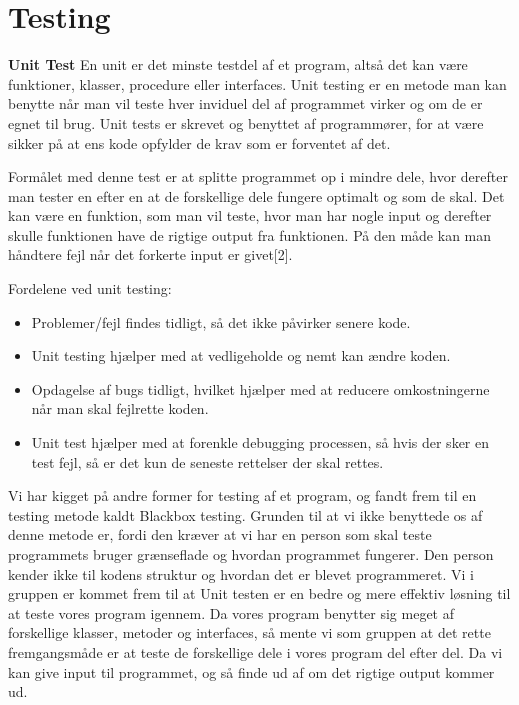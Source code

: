 \section{Testing}\label{Testing}

\textbf{Unit Test} \newline
En unit er det minste testdel af et program, altså det kan være funktioner, klasser, procedure eller interfaces. Unit testing er en metode man kan benytte når man vil teste hver inviduel del af programmet virker og om de er egnet til brug. Unit tests er skrevet og benyttet af programmører, for at være sikker på at ens kode opfylder de krav som er forventet af det. 

\vspace {5mm}

Formålet med denne test er at splitte programmet op i mindre dele, hvor derefter man tester en efter en at de forskellige dele fungere optimalt og som de skal. Det kan være en funktion, som man vil teste, hvor man har nogle input og derefter skulle funktionen have de rigtige output fra funktionen. På den måde kan man håndtere fejl når det forkerte input er givet[2].

\vspace {5mm}

Fordelene ved unit testing:
\begin{itemize}
\item Problemer/fejl findes tidligt, så det ikke påvirker senere kode.
\item Unit testing hjælper med at vedligeholde og nemt kan ændre koden.
\item Opdagelse af bugs tidligt, hvilket hjælper med at reducere omkostningerne når man skal fejlrette koden.
\item Unit test hjælper med at forenkle debugging processen, så hvis der sker en test fejl, så er det kun de seneste rettelser der skal rettes.
\end{itemize}

\vspace {5mm}

Vi har kigget på andre former for testing af et program, og fandt frem til en testing metode kaldt Blackbox testing. Grunden til at vi ikke benyttede os af denne metode er, fordi den kræver at vi har en person som skal  teste programmets bruger grænseflade og hvordan programmet fungerer. Den person kender ikke til kodens struktur og hvordan det er blevet programmeret. Vi i gruppen er kommet frem til at Unit testen er en bedre og mere effektiv løsning til at teste vores program igennem. Da vores program benytter sig meget af forskellige klasser, metoder og interfaces, så mente vi som gruppen at det rette fremgangsmåde er at teste de forskellige dele i vores program del efter del. Da vi kan give input til programmet, og så finde ud af om det rigtige output kommer ud.



